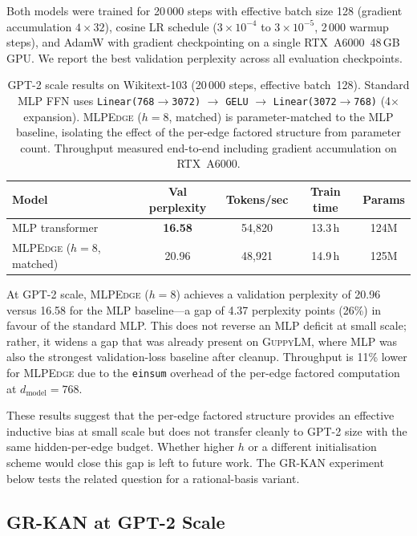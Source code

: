 \documentclass{article}
\newcommand{\mlpedge}{\textsc{MLPEdge}}
\newcommand{\guppylm}{\textsc{GuppyLM}}
\newcommand{\grkan}{\textsc{GR-KAN}}
\begin{document}
Both models were trained for 20\,000 steps with effective batch size 128
(gradient accumulation $4\times32$), cosine LR schedule ($3\times10^{-4}$
to $3\times10^{-5}$, 2\,000 warmup steps), and AdamW with gradient
checkpointing on a single RTX~A6000~48\,GB GPU.
We report the best validation perplexity across all evaluation checkpoints.

\begin{table}[h]
\centering
\caption{%
  GPT-2 scale results on Wikitext-103 (20\,000 steps, effective batch~128).
  Standard MLP FFN uses \texttt{Linear(768$\to$3072)} $\to$ \texttt{GELU}
  $\to$ \texttt{Linear(3072$\to$768)} (4$\times$ expansion).
  \mlpedge{} ($h=8$, matched) is parameter-matched to the MLP baseline,
  isolating the effect of the per-edge factored structure from parameter count.
  Throughput measured end-to-end including gradient accumulation on RTX~A6000.
}
\label{tab:scaling}
\begin{tabular}{lcccc}
\toprule
Model & Val perplexity & Tokens/sec & Train time & Params \\
\midrule
MLP transformer          & \textbf{16.58} & 54{,}820 & 13.3\,h & 124M \\
\mlpedge{} ($h=8$, matched) & 20.96          & 48{,}921 & 14.9\,h & 125M \\
\bottomrule
\end{tabular}
\end{table}

At GPT-2 scale, \mlpedge{} ($h=8$) achieves a validation perplexity of 20.96
versus 16.58 for the MLP baseline---a gap of 4.37 perplexity points (26\%)
in favour of the standard MLP.
This does not reverse an MLP deficit at small scale; rather, it widens a gap
that was already present on \guppylm{}, where MLP was also the strongest
validation-loss baseline after cleanup.
Throughput is 11\% lower for \mlpedge{} due to the \texttt{einsum} overhead
of the per-edge factored computation at $d_\text{model}=768$.

These results suggest that the per-edge factored structure provides an
effective inductive bias at small scale but does not transfer cleanly to
GPT-2 size with the same hidden-per-edge budget.
Whether higher $h$ or a different initialisation scheme would close this gap
is left to future work.
The \grkan{} experiment below tests the related question for a rational-basis variant.

\subsection{\grkan{} at GPT-2 Scale}
\label{sec:grkan_gpt2}
\end{document}
